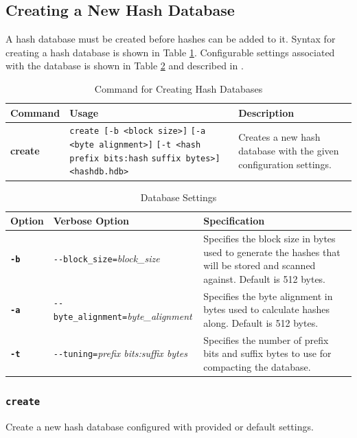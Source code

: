 \documentclass[11pt,fleqn]{article} %
\begin{document}
\subsection{Creating a New Hash Database}
\label{Creating}
A hash database must be created before hashes can be added to it.
Syntax for creating a hash database is shown in Table \ref{tab:createDatabase}.
Configurable settings associated with the database is shown in Table \ref{tab:hashDBSettings} and described in \textbf{}.\\
\begin{table}[!ht]
\centering
\caption{Command for Creating Hash Databases}
\label{tab:createDatabase}
\begin{tabular}{|p{2.5 cm}|p{7 cm}|p{4 cm}|}
\hline \hline
\textbf{Command} & \textbf{Usage} & \textbf{Description} \\
\hline
\textbf{create} & \verb+create [-b <block size>]+ \verb+[-a <byte alignment>]+ \verb+[-t <hash prefix bits:hash+ \verb+suffix bytes>]+ \verb+<hashdb.hdb>+ & Creates a new hash database with the given configuration settings.\\
\hline
\end{tabular}
\end{table}

\begin{table}[!ht]
\centering
\caption{Database Settings}
\label{tab:hashDBSettings}
\begin{tabular}{|p{1.5 cm}|p{8 cm}|p{4 cm}|}
\hline \hline
\textbf{Option} & \textbf{Verbose Option} & \textbf{Specification} \\
\hline
\textbf{\texttt{-b}} & \verb+--block_size=+\textit{block\_size} & Specifies the block size in bytes used to generate the hashes that will be stored and scanned against. Default is 512 bytes.  \\
\hline
\textbf{\texttt{-a}} & \verb+--byte_alignment=+\textit{byte\_alignment} & Specifies the byte alignment in bytes used to calculate hashes along. Default is 512 bytes.  \\
\hline
\textbf{\texttt{-t}} & \verb+--tuning=+\textit{prefix bits:suffix bytes} & Specifies the number of prefix bits and suffix bytes to use for compacting the database.\\
\hline
\end{tabular}
\end{table}

\subsubsection{\texttt{create}}
Create a new hash database configured with provided or default settings.\\
\end{document}
